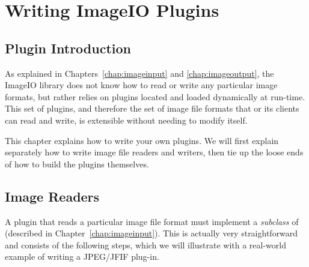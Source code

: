\chapter{Writing ImageIO Plugins}
\label{chap:writingplugins}



\section{Plugin Introduction}
\label{sec:pluginintro}

As explained in Chapters~\ref{chap:imageinput} and
\ref{chap:imageoutput}, the ImageIO library does not know how to read or
write any particular image formats, but rather relies on plugins located
and loaded dynamically at run-time.  This set of plugins, and therefore
the set of image file formats that \product or its clients can read and
write, is extensible without needing to modify \product itself.  

This chapter explains how to write your own \product plugins.  We will
first explain separately how to write image file readers and writers,
then tie up the loose ends of how to build the plugins themselves.

\section{Image Readers}
\label{sec:pluginreaders}

A plugin that reads a particular image file format must implement a
\emph{subclass} of \ImageInput (described in
Chapter~\ref{chap:imageinput}).  This is actually very straightforward
and consists of the following steps, which we will illustrate with a
real-world example of writing a JPEG/JFIF plug-in.

